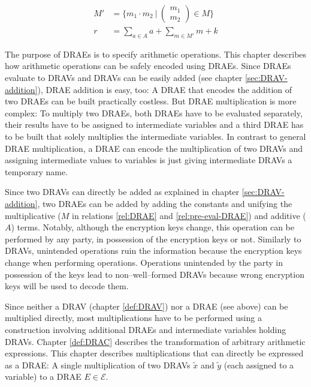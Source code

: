 \begin{align*}
M' &= \Bigg\{ m_1 \cdot m_2\ \Bigg|\ \begin{pmatrix}m_1\\m_2\end{pmatrix}
\in M \Bigg\} \\
r & = \sum_{a \in A}a + \sum_{m \in M'}m + k
\end{align*}



The purpose of DRAEs is to specify arithmetic operations. This chapter describes
how arithmetic operations can be safely encoded using DRAEs. Since DRAEs
evaluate to DRAVs and DRAVs can be easily added (see chapter
\ref{sec:DRAV-addition}), DRAE addition is easy, too: A DRAE that encodes the
addition of two DRAEs can be built practically costless. But DRAE multiplication
is more complex: To multiply two DRAEs, both DRAEs have to be
evaluated separately, their results have to be assigned to intermediate
variables and a third DRAE has to be built that solely multiplies the
intermediate variables. In contrast to general DRAE multiplication, a DRAE can
encode the multiplication of two DRAVs and assigning intermediate values to
variables is just giving intermediate DRAVs a temporary name.


\label{sec:DRAE-addition}

Since two DRAVs can directly be added as explained in chapter
\ref{sec:DRAV-addition}, two DRAEs can be added by adding the constants and
unifying the multiplicative ($M$ in relations \ref{rel:DRAE} and
\ref{rel:pre-eval-DRAE}) and additive ($A$) terms. Notably, although the
encryption keys change, this operation can be performed by any party, in
possession of the encryption keys or not. Similarly to DRAVs, unintended
operations ruin the information because the encryption keys change when
performing operations. Operations unintended by the party in possession of the
keys lead to non--well--formed DRAVs because wrong encryption keys will be used
to decode them.


\label{sec:DRAE-multiplication}

Since neither a DRAV (chapter \ref{def:DRAV}) nor a DRAE (see above) can be
multiplied directly, most multiplications have to be performed using a
construction involving additional DRAEs and intermediate variables holding
DRAVs. Chapter \ref{def:DRAC} describes the transformation of arbitrary
arithmetic expressions. This chapter describes multiplications that can directly
be expressed as a DRAE: A single multiplication of two DRAVs $\widetilde{x}$ and
$\widetilde{y}$ (each assigned to a variable) to a DRAE $E \in \mathcal{E}$.

